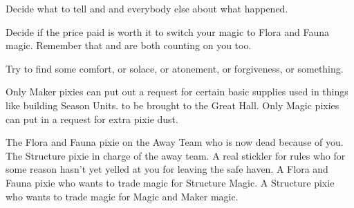 \documentclass[char]{PP}
\begin{document}
\begin{itemz}
	\item Decide what to tell \cSPM{} and \cELove{} and everybody else about what happened.
	\item Decide if the price paid is worth it to switch your magic to Flora and Fauna magic. Remember that \cFWanabe{} and \cSAdvisor{} are both counting on you too.
	\item Try to find some comfort, or solace, or atonement, or forgiveness, or something.
\end{itemz}

\begin{itemz}[Notes]
	\item Only Maker pixies can put out a request for certain basic supplies used in things like building Season Units. to be brought to the Great Hall. Only Magic pixies can put in a request for extra pixie dust.
\end{itemz}

\begin{contacts}
	\contact{\cFLost{}} The Flora and Fauna pixie on the Away Team who is now dead because of you.
	\contact{\cSPM{}} The Structure pixie in charge of the away team. A real stickler for rules who for some reason hasn’t yet yelled at you for leaving the safe haven.
	\contact{\cFWanabe{}} A Flora and Fauna pixie who wants to trade \cFWanabe{\their} magic for Structure Magic.
	\contact{\cSAdvisor{}} A Structure pixie who wants to trade \cSAdvisor{\their} magic for Magic and Maker magic.
\end{contacts}
\end{document}
